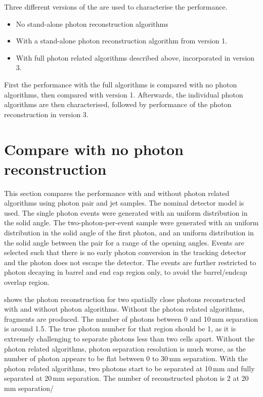 Three different versions of the \pandora are used to characterise  the performance.
\begin{itemize}
  \item No stand-alone photon reconstruction algorithms
  \item With a stand-alone photon reconstruction algorithm from \pandora version 1.
  \item With full photon related algorithms described above, incorporated in \pandora version 3.
\end{itemize}

First the performance with the full algorithms is compared with no photon algorithms, then compared with \pandora version 1. Afterwards, the individual photon algorithms are then characterised, followed by performance of the photon reconstruction in \pandora version 3.

\section{Compare with no photon reconstruction}

This section compares the performance with and without photon related algorithms using photon pair and jet samples. The nominal \ILD detector model is used. The single photon events were generated with an uniform distribution in the solid angle. The two-photon-per-event sample were generated with an uniform distribution in the solid angle of the first photon, and an uniform distribution in the solid angle    between the pair for a range of the opening angles. Events are selected such that there is no early photon conversion in the tracking detector and the photon does not escape the detector. The events are further restricted to photon decaying in barrel and end cap region only, to avoid the barrel/endcap overlap region.


 shows the photon reconstruction for two spatially close photons  reconstructed with and without photon algorithms. Without the photon related algorithms, fragments are produced.  The number of photons between 0 and 10\,mm separation is around 1.5. The true photon number for that region should be 1, as it is extremely challenging to separate photons less than two cells apart.  Without the photon related algorithms, photon separation resolution is much worse, as the number of photon appears to be flat between 0 to 30\,mm separation. With the photon related algorithms, two photons start to be separated at 10\,mm and fully separated at 20\,mm separation.  The number of reconstructed photon is 2 at 20\,mm separation/


